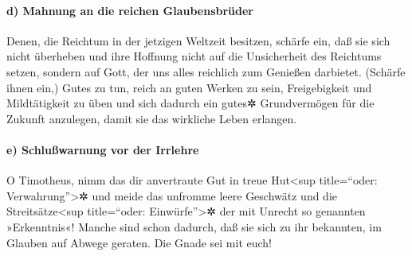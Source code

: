 \hypertarget{d-mahnung-an-die-reichen-glaubensbruxfcder}{%
\paragraph{d) Mahnung an die reichen
Glaubensbrüder}\label{d-mahnung-an-die-reichen-glaubensbruxfcder}}

 Denen, die Reichtum in der jetzigen Weltzeit besitzen,
schärfe ein, daß sie sich nicht überheben und ihre Hoffnung nicht auf
die Unsicherheit des Reichtums setzen, sondern auf Gott, der uns alles
reichlich zum Genießen darbietet.  (Schärfe ihnen ein,)
Gutes zu tun, reich an guten Werken zu sein, Freigebigkeit und
Mildtätigkeit zu üben  und sich dadurch ein gutes✲
Grundvermögen für die Zukunft anzulegen, damit sie das wirkliche Leben
erlangen.

\hypertarget{e-schluuxdfwarnung-vor-der-irrlehre}{%
\paragraph{e) Schlußwarnung vor der
Irrlehre}\label{e-schluuxdfwarnung-vor-der-irrlehre}}

 O Timotheus, nimm das dir anvertraute Gut in treue
Hut\textless sup title=``oder: Verwahrung''\textgreater✲ und meide das
unfromme leere Geschwätz und die Streitsätze\textless sup title=``oder:
Einwürfe''\textgreater✲ der mit Unrecht so genannten »Erkenntnis«!
 Manche sind schon dadurch, daß sie sich zu ihr
bekannten, im Glauben auf Abwege geraten. Die Gnade sei mit euch!
